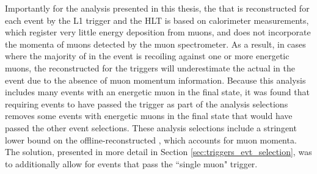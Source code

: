 Importantly for the analysis presented in this thesis, the \met that is reconstructed for each event by the L1 trigger and the HLT is based on calorimeter measurements, which register very little energy deposition from muons, and does not incorporate the momenta of muons detected by the muon spectrometer. As a result, in cases where the majority of \met in the event is recoiling against one or more energetic muons, the \met reconstructed for the triggers will underestimate the actual \met in the event due to the absence of muon momentum information. Because this analysis includes many events with an energetic muon in the final state, it was found that requiring events to have passed the \met trigger as part of the analysis selections removes some events with energetic muons in the final state that would have passed the other event selections. These analysis selections include a stringent lower bound on the offline-reconstructed \met, which accounts for muon momenta. The solution, presented in more detail in Section \ref{sec:triggers_evt_selection}, was to additionally allow for events that pass the ``single muon" trigger.


